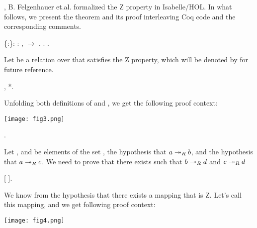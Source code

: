     \cite{zproperty}, B. Felgenhauer et.al. formalized the Z
    property in Isabelle/HOL. In what follows, we present the theorem
    and its proof interleaving Coq code and the corresponding
    comments. \begin{coqdoccode}
\coqdocemptyline
\coqdocnoindent
{}  \{:\}: \coqdockw{\ensuremath{\forall}} :  ,   \ensuremath{\rightarrow}  .\coqdoceol
\coqdocnoindent
{}.\coqdoceol
\coqdocindent{1.00em}
  . \end{coqdoccode}
Let  be a relation over  that satisfies
    the Z property, which will be denoted by  for future
    reference. \begin{coqdoccode}
\coqdocemptyline
\coqdocindent{1.00em}
 ,   *. \end{coqdoccode}
Unfolding both definitions of
   and , we get the following proof context:


      \texttt{[image: fig3.png]} \begin{coqdoccode}
\coqdocemptyline
\coqdocindent{1.00em}
     . \end{coqdoccode}
Let ,  and  be elements of
     the set ,  the hypothesis that $a \twoheadrightarrow_R b$, and
      the hypothesis that $a\twoheadrightarrow_R c$. We need to prove that
     there exists  such that $b\twoheadrightarrow_R d$ and $c\twoheadrightarrow_R d$ \begin{coqdoccode}
\coqdocemptyline
\coqdocindent{1.00em}
   [ ]. \end{coqdoccode}
We know from the hypothesis
      that there exists a mapping  that is Z. Let's call
      this mapping, and we get following proof context:


      \texttt{[image: fig4.png]}


